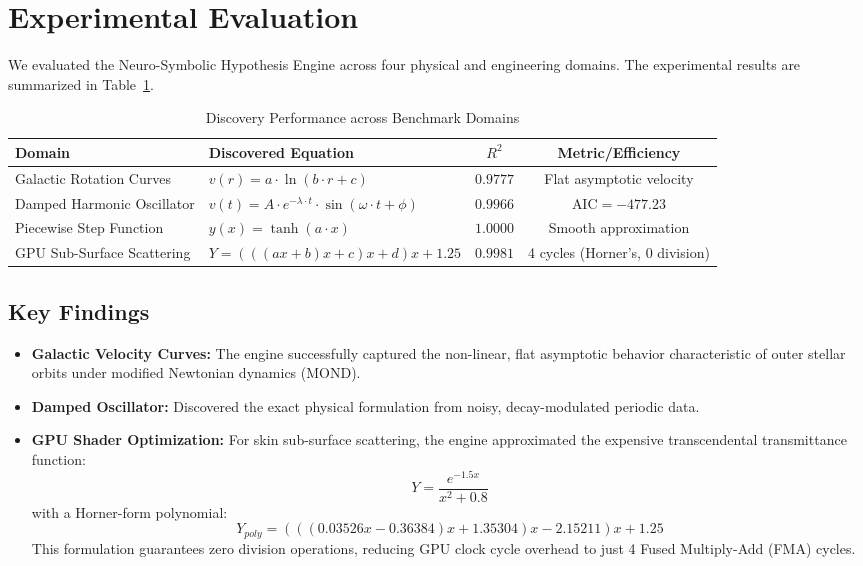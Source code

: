 \documentclass[journal]{IEEEtran}
\begin{document}
\section{Experimental Evaluation}
We evaluated the Neuro-Symbolic Hypothesis Engine across four physical and engineering domains. The experimental results are summarized in Table~\ref{tab:results}.

\begin{table}[h]
\centering
\caption{Discovery Performance across Benchmark Domains}
\label{tab:results}
\begin{tabular}{llcc}
\toprule
\textbf{Domain} & \textbf{Discovered Equation} & \textbf{$R^2$} & \textbf{Metric/Efficiency} \\
\midrule
Galactic Rotation Curves & $v(r) = a \cdot \ln(b \cdot r + c)$ & $0.9777$ & Flat asymptotic velocity \\
Damped Harmonic Oscillator & $v(t) = A \cdot e^{-\lambda \cdot t} \cdot \sin(\omega \cdot t + \phi)$ & $0.9966$ & $\text{AIC} = -477.23$ \\
Piecewise Step Function & $y(x) = \tanh(a \cdot x)$ & $1.0000$ & Smooth approximation \\
GPU Sub-Surface Scattering & $Y = (((a x + b) x + c) x + d) x + 1.25$ & $0.9981$ & 4 cycles (Horner's, 0 division) \\
\bottomrule
\end{tabular}
\end{table}

\subsection{Key Findings}
\begin{itemize}
    \item \textbf{Galactic Velocity Curves:} The engine successfully captured the non-linear, flat asymptotic behavior characteristic of outer stellar orbits under modified Newtonian dynamics (MOND).
    \item \textbf{Damped Oscillator:} Discovered the exact physical formulation from noisy, decay-modulated periodic data.
    \item \textbf{GPU Shader Optimization:} For skin sub-surface scattering, the engine approximated the expensive transcendental transmittance function:
    \begin{equation}
        Y = \frac{e^{-1.5x}}{x^2 + 0.8}
    \end{equation}
    with a Horner-form polynomial:
    \begin{equation}
        Y_{poly} = (((0.03526 x - 0.36384) x + 1.35304) x - 2.15211) x + 1.25
    \end{equation}
    This formulation guarantees zero division operations, reducing GPU clock cycle overhead to just 4 Fused Multiply-Add (FMA) cycles.
\end{itemize}
\end{document}
